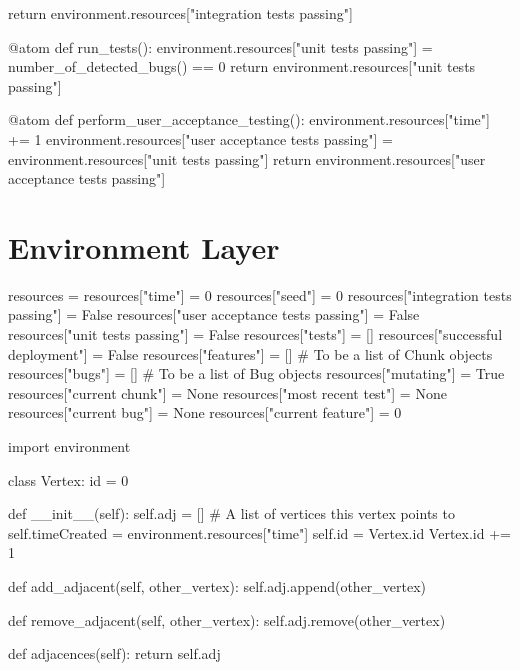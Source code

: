 \begin{appendices}
\begin{pyglist}[language = python, caption={Atoms used in experiments}, listingname=\textbf{Code Listing} \comment{, fvset={frame=single,framerule=1pt}}, numbers=left]
    return environment.resources["integration tests passing"]


@atom
def run_tests():
    environment.resources["unit tests passing"] = number_of_detected_bugs() == 0
    return environment.resources["unit tests passing"]


@atom
def perform_user_acceptance_testing():
    environment.resources["time"] += 1
    environment.resources["user acceptance tests passing"] = environment.resources["unit tests passing"]
    return environment.resources["user acceptance tests passing"]
\end{pyglist}

\chapter{Environment Layer}
\label{appendix:environment}
\begin{pyglist}[language = python, caption={Environment layer contents}, listingname=\textbf{Code Listing} \comment{, fvset={frame=single,framerule=1pt}}, numbers=left]
resources = {}
resources["time"] = 0
resources["seed"] = 0
resources["integration tests passing"] = False
resources["user acceptance tests passing"] = False
resources["unit tests passing"] = False
resources["tests"] = []
resources["successful deployment"] = False
resources["features"] = []  # To be a list of Chunk objects
resources["bugs"] = []  # To be a list of Bug objects
resources["mutating"] = True
resources["current chunk"] = None
resources["most recent test"] = None
resources["current bug"] = None
resources["current feature"] = 0
\end{pyglist}

\begin{pyglist}[language = python, caption={Classes used by sociotechnical environment}, listingname=\textbf{Code Listing} \comment{, fvset={frame=single,framerule=1pt}}, numbers=left]
import environment

class Vertex:
    id = 0

    def __init__(self):
        self.adj = []  # A list of vertices this vertex points to
        self.timeCreated = environment.resources["time"]
        self.id = Vertex.id
        Vertex.id += 1


    def add_adjacent(self, other_vertex):
        self.adj.append(other_vertex)

    def remove_adjacent(self, other_vertex):
        self.adj.remove(other_vertex)

    def adjacences(self):
        return self.adj


\end{pyglist}
\end{appendices}
